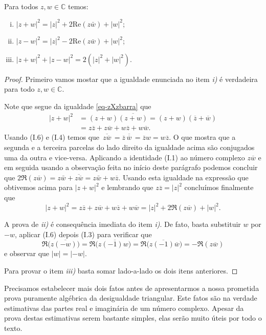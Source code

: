\begin{proposicao}\label{eq-quadrado-modulo}
Para todos $z,w\in\mathbb{C}$ temos:
\begin{enumerate}[i)]
 \item $|z+w|^2= |z|^2+2\mathrm{Re}(z\bar{w})+|w|^2$;
 \item $|z-w|^2= |z|^2-2\mathrm{Re}(z\bar{w})+|w|^2$;
 \item $|z+w|^2+|z-w|^2 = 2(|z|^2+|w|^2)$.
\end{enumerate}
\end{proposicao}
\begin{proof}
Primeiro vamos mostar que a igualdade enunciada no item \textit{i)} é verdadeira para todo
$z,w\in\mathbb{C}$.  

Note que segue da igualdade \eqref{eq-zXzbarra} que 
\begin{align*}
|z+w|^2
&=
(z+w)\overline{(z+w)}
=
(z+w)(\overline{z}+\overline{w})
\\
&=
z\overline{z}+z\overline{w}+w\overline{z}+w\overline{w}.
\end{align*}
Usando (I.6) e (I.4) temos que 
$
\overline{\,z\overline{w}\,} 
= 
\overline{z}\overline{\,\overline{w}\,} 
=
\overline{z}w
=
w\overline{z}
$.
O que mostra que a segunda e a terceira parcelas do lado direito da igualdade
acima são conjugados uma da outra e vice-versa. 
Aplicando a identidade (I.1) ao número complexo $z\overline{w}$ e em seguida usando a observação 
feita no início deste parágrafo podemos concluir que 
$2\Re(z\overline{w}) = z\bar{w}+ \overline{z\overline{w}} = z\bar{w}+w\overline{z}$. 
Usando esta igualdade na expressão que obtivemos acima para $|z+w|^2$ 
e lembrando que $z\overline{z}=|z|^2$ concluímos finalmente que 
\[
|z+w|^2
=
z\overline{z}+z\overline{w}+w\overline{z}+w\overline{w}
=
|z|^2+2\Re(z\overline{w})+|w|^2.
\]

A prova de \textit{ii)} é consequência imediata do item \textit{i)}. De fato, basta substituir $w$ por $-w$,
aplicar (I.6) depois (I.3) para verificar que 
\[
\Re\big(z\overline{(-w)}\big)
= 
\Re\big(z\overline{(-1)w}\big) 
=  
\Re\big(z\overline{(-1)}\overline{w}\big)
=
- \Re(z\overline{w})
\] 
e observar que $|w|=|-w|$. 

Para provar o item \textit{iii)} basta somar lado-a-lado os dois itens anteriores.
\end{proof}

\bigskip 

Precisamos estabelecer mais dois fatos antes de apresentarmos a nossa 
prometida prova puramente algébrica da desigualdade triangular.
Este fatos são na verdade estimativas das partes real e imaginária
de um número complexo. Apesar da prova destas estimativas serem bastante simples, elas serão muito úteis por todo o texto.

